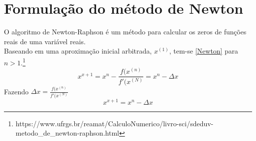 







\section{Formula\c{c}\~ao do m\'etodo de Newton}

O algoritmo de Newton-Raphson é um método para calcular os zeros de funções reais de uma variável reais.\\
Baseando em uma aproximação inicial arbitrada, $x^{(1)}$, tem-se \ref{Newton} para $n>1$.\footnote{https://www.ufrgs.br/reamat/CalculoNumerico/livro-sci/sdeduv-metodo\_de\_newton-raphson.html}
\begin{equation}
    x^{x+1} = x^{n} - \frac{f(x^{(n)}}{f'(x^{(N)}} = x^{n} - \Delta x
    \label{Newton}
\end{equation}
Fazendo $\Delta x = \frac{f(x^{(n)}}{f'(x^{(N)}}$ 
\begin{equation}
    x^{x+1} = x^{n} - \Delta x
    \label{Newton_Delta}
\end{equation}
